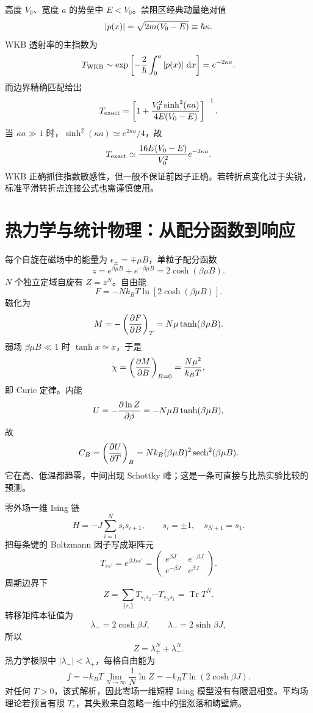 \begin{examplebox}[title=例 9：方势垒的 WKB 指数与精确结果比较]
高度 $V_0$、宽度 $a$ 的势垒中 $E<V_0$。禁阻区经典动量绝对值
\[
\left|p(x)\right|=\sqrt{2m(V_0-E)}\equiv\hbar\kappa .
\]
WKB 透射率的主指数为
\[
T_{\rm WKB}\sim
\exp\left[-\frac2\hbar\int_0^a\left|p(x)\right|\,\mathrm d x\right]
=e^{-2\kappa a}.
\]
而边界精确匹配给出
\[
T_{\rm exact}
=\left[
1+\frac{V_0^2\sinh^2(\kappa a)}{4E(V_0-E)}
\right]^{-1}.
\]
当 $\kappa a\gg1$ 时，$\sinh^2(\kappa a)\simeq e^{2\kappa a}/4$，故
\[
T_{\rm exact}\simeq
\frac{16E(V_0-E)}{V_0^2}e^{-2\kappa a}.
\]
WKB 正确抓住指数敏感性，但一般不保证前因子正确。若转折点变化过于尖锐，标准平滑转折点连接公式也需谨慎使用。
\end{examplebox}

\section{热力学与统计物理：从配分函数到响应}

\begin{examplebox}[title=例 10：两能级顺磁体的配分函数、磁化与热容]
每个自旋在磁场中的能量为 $\epsilon_\pm=\mp\mu B$，单粒子配分函数
\[
z=e^{\beta\mu B}+e^{-\beta\mu B}=2\cosh(\beta\mu B).
\]
$N$ 个独立定域自旋有 $Z=z^N$。自由能
\[
F=-Nk_BT\ln[2\cosh(\beta\mu B)].
\]
磁化为
\[
M=-\left(\frac{\partial F}{\partial B}\right)_T
=N\mu\tanh(\beta\mu B).
\]
弱场 $\beta\mu B\ll1$ 时 $\tanh x\simeq x$，于是
\[
\chi=\left(\frac{\partial M}{\partial B}\right)_{B=0}
=\frac{N\mu^2}{k_BT},
\]
即 Curie 定律。内能
\[
U=-\frac{\partial \ln Z}{\partial \beta}
=-N\mu B\tanh(\beta\mu B),
\]
故
\[
C_B=\left(\frac{\partial U}{\partial T}\right)_B
=Nk_B(\beta\mu B)^2\operatorname{sech}^2(\beta\mu B).
\]
它在高、低温都趋零，中间出现 Schottky 峰；这是一条可直接与比热实验比较的预测。
\end{examplebox}

\begin{examplebox}[title=例 11：一维 Ising 链的转移矩阵]
零外场一维 Ising 链
\[
H=-J\sum_{i=1}^Ns_is_{i+1},\qquad s_i=\pm1,\quad s_{N+1}=s_1.
\]
把每条键的 Boltzmann 因子写成矩阵元
\[
T_{ss'}=e^{\beta Jss'}
=\begin{pmatrix}e^{\beta J}&e^{-\beta J}\\
e^{-\beta J}&e^{\beta J}\end{pmatrix}.
\]
周期边界下
\[
Z=\sum_{\{s_i\}}T_{s_1s_2}\cdots T_{s_Ns_1}
=\operatorname{Tr}T^N.
\]
转移矩阵本征值为
\[
\lambda_+=2\cosh\beta J,\qquad
\lambda_-=2\sinh\beta J,
\]
所以
\[
Z=\lambda_+^N+\lambda_-^N.
\]
热力学极限中 $|\lambda_-|<\lambda_+$，每格自由能为
\[
f=-k_BT\lim_{N\to\infty}\frac1N\ln Z
=-k_BT\ln(2\cosh\beta J).
\]
对任何 $T>0$，该式解析，因此零场一维短程 Ising 模型没有有限温相变。平均场理论若预言有限 $T_c$，其失败来自忽略一维中的强涨落和畴壁熵。
\end{examplebox}

